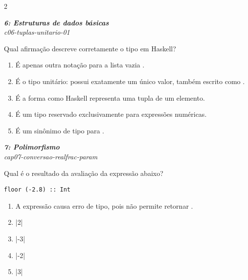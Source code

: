 \documentclass[a4paper,10pt,brazil]{article}
\begin{document}
\begin{multicols}{2}
\begin{enumerate}
\end{enumerate}

\begin{flushright}
  \footnotesize
  \textit{\textbf{6: Estruturas de dados básicas}}\\
  \textit{c06-tuplas-unitario-01}\\

\end{flushright}
Qual afirmação descreve corretamente o tipo \haskellinline{()} em Haskell?

\begin{enumerate}
  \item É apenas outra notação para a lista vazia \haskellinline{[]}.

  \item É o tipo unitário: possui exatamente um único valor, também escrito como \haskellinline{()}.

  \item É a forma como Haskell representa uma tupla de um elemento.

  \item É um tipo reservado exclusivamente para expressões numéricas.

  \item É um sinônimo de tipo para .


\end{enumerate}

\begin{flushright}
  \footnotesize
  \textit{\textbf{7: Polimorfismo}}\\
  \textit{cap07-conversao-realfrac-param}\\

\end{flushright}
Qual é o resultado da avaliação da expressão abaixo?

\begin{verbatim}
floor (-2.8) :: Int
\end{verbatim}

\begin{enumerate}
  \item A expressão causa erro de tipo, pois  não permite retornar .
  \item \haskellinline|2|
  \item \haskellinline|-3|
  \item \haskellinline|-2|
  \item \haskellinline|3|


\end{enumerate}
\end{multicols}
\end{document}
